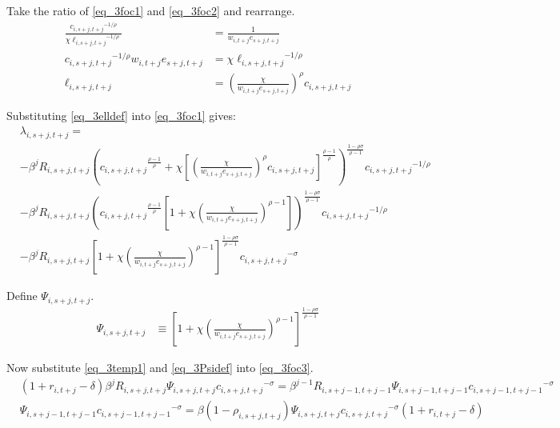 \documentclass[letterpaper,12pt]{article}
\theoremstyle{definition}
\numberwithin{equation}{section}
\begin{document}
\begin{spacing}{1.5}
	Take the ratio of \eqref{eq_3foc1} and \eqref{eq_3foc2} and rearrange.
	\begin{align}
		\frac{{c_{i,s+j,t+j}}^{-1/\rho}} {\chi {\ell_{i,s+j,t+j}}^{-1/\rho}} \nonumber & = \frac{1} {w_{i,t+j} e_{s+j,t+j}} \nonumber \\
		{c_{i,s+j,t+j}}^{-1/\rho} w_{i,t+j} e_{s+j,t+j} & = \chi {\ell_{i,s+j,t+j}}^{-1/\rho} \nonumber \\
		\ell_{i,s+j,t+j} & = \left(\frac{\chi} {w_{i,t+j} e_{s+j,t+j}}\right)^{\rho} c_{i,s+j,t+j} \label{eq_3elldef}
	\end{align}	

	Substituting \eqref{eq_3elldef} into \eqref{eq_3foc1} gives:
	\begin{align}
	    & \lambda_{i,s+j,t+j} = \nonumber \\
		& - \beta^j R_{i,s+j,t+j} \left( {c_{i,s+j,t+j}}^{\frac{\rho-1}{\rho}} + \chi \left[\left(\frac{\chi} {w_{i,t+j} e_{s+j,t+j}}\right)^{\rho} c_{i,s+j,t+j}\right]^{\frac{\rho-1}{\rho}}\right)^{\frac{1-\rho \sigma}{\rho-1}} {c_{i,s+j,t+j}}^{-1/\rho} \nonumber \\
		& - \beta^j R_{i,s+j,t+j} \left( {c_{i,s+j,t+j}}^{\frac{\rho-1}{\rho}} \left[1 + \chi \left(\frac{\chi} {w_{i,t+j} e_{s+j,t+j}}\right)^{\rho-1} \right]\right)^{\frac{1-\rho \sigma}{\rho-1}} {c_{i,s+j,t+j}}^{-1/\rho} \nonumber \\
		& - \beta^j R_{i,s+j,t+j} \left[1 + \chi \left(\frac{\chi} {w_{i,t+j} e_{s+j,t+j}}\right)^{\rho-1} \right]^{\frac{1-\rho \sigma}{\rho-1}} {c_{i,s+j,t+j}}^{-\sigma} \label{eq_3temp1}
	\end{align}

	Define $\Psi_{i,s+j,t+j}$.
	\begin{align}
        \Psi_{i,s+j,t+j} & \equiv \left[1 + \chi \left(\frac{\chi} {w_{i,t+j} e_{s+j,t+j}}\right)^{\rho-1} \right]^{\frac{1-\rho \sigma}{\rho-1}} \label{eq_3Psidef}
	\end{align}	

	Now substitute \eqref{eq_3temp1} and \eqref{eq_3Psidef} into \eqref{eq_3foc3}.
	\begin{align}
        & (1+r_{i,t+j}-\delta) \beta^j R_{i,s+j,t+j} \Psi_{i,s+j,t+j} {c_{i,s+j,t+j}}^{-\sigma} = \beta^{j-1} R_{i,s+j-1,t+j-1} \Psi_{i,s+j-1,t+j-1} {c_{i,s+j-1,t+j-1}}^{-\sigma} \nonumber \\
        & \Psi_{i,s+j-1,t+j-1} {c_{i,s+j-1,t+j-1}}^{-\sigma} = \beta (1-\rho_{i,s+j,t+j}) \Psi_{i,s+j,t+j} {c_{i,s+j,t+j}}^{-\sigma} (1+r_{i,t+j}-\delta) \label{eq_3Euler}
	\end{align}	


\end{spacing}
\end{document}
